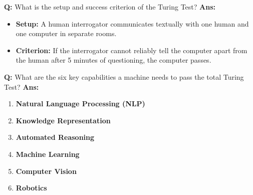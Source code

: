 \documentclass[10pt,a4paper,twocolumn]{article}
\begin{document}
\begin{tcolorbox}[
  colback=white,
  colframe=UnitColorOne,
  colbacktitle=gray!10!white,
  coltitle=black,
  fonttitle=\bfseries\sffamily\small,
  title={Unit I $\bullet$ Card 3: Turing Test Setup \& Criteria},
  boxrule=1.2pt,
  arc=2mm,
  outer arc=2mm,
  boxsep=1.5mm,
  top=1mm,
  bottom=1mm,
  left=1.5mm,
  right=1.5mm,
  before skip=2.5mm,
  after skip=2.5mm
]
\textbf{Q:} What is the setup and success criterion of the Turing Test?
\tcbline
\textbf{Ans:} \begin{itemize}
  \item   \textbf{Setup:} A human interrogator communicates textually with one human and one computer in separate rooms.
  \item   \textbf{Criterion:} If the interrogator cannot reliably tell the computer apart from the human after 5 minutes of questioning, the computer passes.
\end{itemize}
\end{tcolorbox}


\begin{tcolorbox}[
  colback=white,
  colframe=UnitColorOne,
  colbacktitle=gray!10!white,
  coltitle=black,
  fonttitle=\bfseries\sffamily\small,
  title={Unit I $\bullet$ Card 4: Six Capabilities for Turing Test},
  boxrule=1.2pt,
  arc=2mm,
  outer arc=2mm,
  boxsep=1.5mm,
  top=1mm,
  bottom=1mm,
  left=1.5mm,
  right=1.5mm,
  before skip=2.5mm,
  after skip=2.5mm
]
\textbf{Q:} What are the six key capabilities a machine needs to pass the total Turing Test?
\tcbline
\textbf{Ans:} \begin{enumerate}
  \item \textbf{Natural Language Processing (NLP)}
  \item \textbf{Knowledge Representation}
  \item \textbf{Automated Reasoning}
  \item \textbf{Machine Learning}
  \item \textbf{Computer Vision}
  \item \textbf{Robotics}
\end{enumerate}
\end{tcolorbox}
\end{document}
